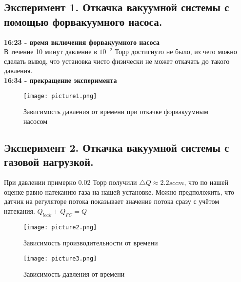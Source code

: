 \documentclass[a4paper]{article}
\begin{document}
\subsection{Эксперимент 1. Откачка вакуумной системы с помощью форвакуумного насоса.}
\textbf{16:23 - время включения форвакуумного насоса}\\
В течение 10 минут давление в $10^{-2}$ Торр достигнуто не было, из чего можно сделать вывод, что установка чисто физически не может откачать до такого давления.\\
\textbf{16:34 - прекращение эксперимента}\\

\begin{figure}[h]
    \centering
    \texttt{[image: picture1.png]}
    \caption{Зависимость давления от времени при откачке форвакуумным насосом}
    \label{fig:vac}
\end{figure}


\subsection{Эксперимент 2. Откачка вакуумной системы с газовой нагрузкой.}
При давлении примерно 0.02 Торр получили $\triangle Q \approx 2.2 sccm $, что по нашей оценке равно натеканию газа на нашей установке. Можно предположить, что датчик на регуляторе потока показывает значение потока сразу с учётом натекания. $Q_{leak} + Q_{FC} = Q$

\begin{figure}[h]
    \centering
    \texttt{[image: picture2.png]}
    \caption{Зависимость производительности от времени}
    \label{fig:vac}
\end{figure}

\begin{figure}[h]
    \centering
    \texttt{[image: picture3.png]}
    \caption{Зависимость давления от времени}
    \label{fig:vac}
\end{figure}
\end{document}
